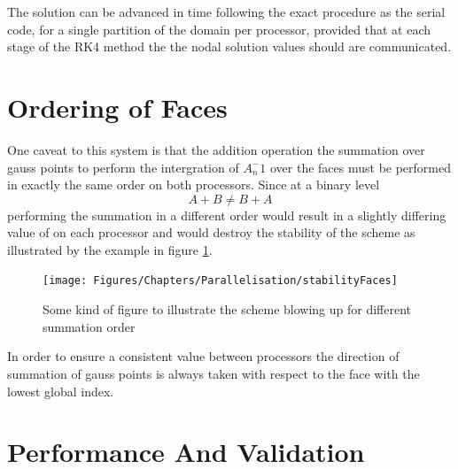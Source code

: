 The solution can be advanced in time following the exact procedure as the serial code, for a single partition of the domain per processor, provided that at each stage of the RK4 method the the nodal solution values should are communicated.

\section{Ordering of Faces}

One caveat to this system is that the addition operation the summation over gauss points to perform the intergration of $A_n^-1$ over the faces must be performed in exactly the same order on both processors. Since at a binary level $$A + B \ne B + A$$ performing the summation in a different order would result in a slightly differing value of on each processor and would destroy the stability of the scheme as illustrated by the example in figure \ref{stability-faces}.

\begin{figure}[htbp!]
 \centering
 \texttt{[image: Figures/Chapters/Parallelisation/stabilityFaces]}
 \caption{Some kind of figure to illustrate the scheme blowing up for different summation order}
 \label{stability-faces}
\end{figure}

In order to ensure a consistent value between processors the direction of summation of gauss points is always taken with respect to the face with the lowest global index.


\section{Performance And Validation}

